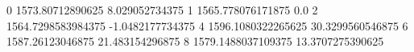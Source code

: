 0 1573.80712890625 8.029052734375
1 1565.778076171875 0.0
2 1564.7298583984375 -1.0482177734375
4 1596.1080322265625 30.3299560546875
6 1587.26123046875 21.483154296875
8 1579.1488037109375 13.3707275390625
